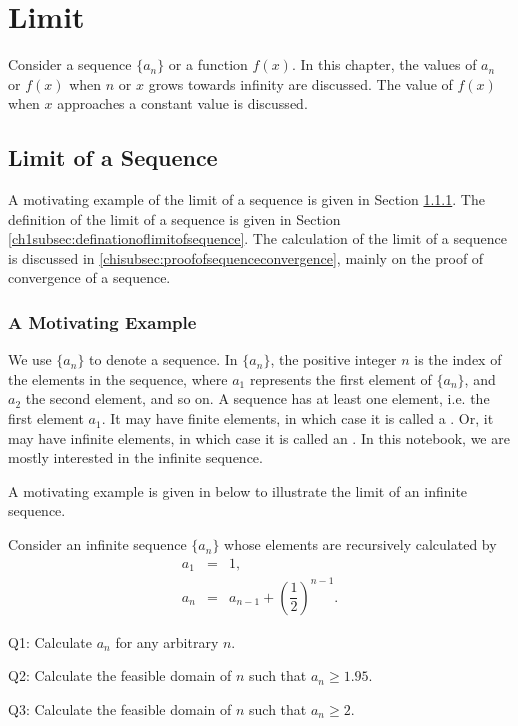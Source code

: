 \chapter{Limit} \label{ch1title}

Consider a sequence $\{a_n\}$ or a function $f(x)$. In this chapter, the values of $a_n$ or $f(x)$ when $n$ or $x$ grows towards infinity are discussed. The value of $f(x)$ when $x$ approaches a constant value is discussed.

\section{Limit of a Sequence} \label{ch1sec:limitofsequence}

A motivating example of the limit of a sequence is given in Section \ref{ch1subsec:sequencemotivatingexample}. The definition of the limit of a sequence is given in Section \ref{ch1subsec:definationoflimitofsequence}. The calculation of the limit of a sequence is discussed in \ref{chisubsec:proofofsequenceconvergence}, mainly on the proof of convergence of a sequence.

\subsection{A Motivating Example} \label{ch1subsec:sequencemotivatingexample}

We use $\{a_n\}$ to denote a sequence. In $\{a_n\}$, the positive integer $n$ is the index of the elements in the sequence, where $a_1$ represents the first element of $\{a_n\}$, and $a_2$ the second element, and so on. A sequence has at least one element, i.e. the first element $a_1$. It may have finite elements, in which case it is called a . Or, it may have infinite elements, in which case it is called an . In this notebook, we are mostly interested in the infinite sequence.

A motivating example is given in below to illustrate the limit of an infinite sequence.

\begin{shortbox}

Consider an infinite sequence $\{a_n\}$ whose elements are recursively calculated by
\begin{eqnarray}
  a_1 &=& 1, \label{ch1eq:motivatingexampleinitialcondition} \\
  a_n &=& a_{n-1} + \left(\dfrac{1}{2}\right)^{n-1}. \label{ch1eq:motivatingexamplerecursive}
\end{eqnarray}

Q1: Calculate $a_n$ for any arbitrary $n$.

Q2: Calculate the feasible domain of $n$ such that $a_n\geq 1.95$.

Q3: Calculate the feasible domain of $n$ such that $a_n\geq 2$.
\end{shortbox}

